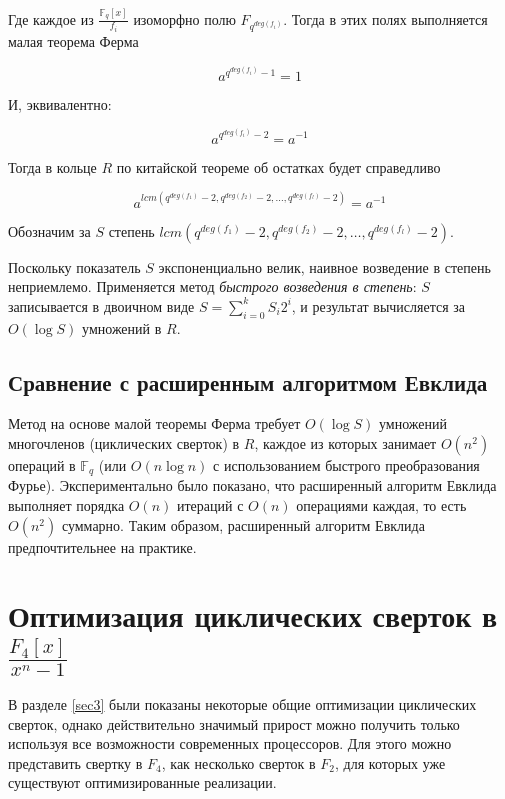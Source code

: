 \documentclass[14pt]{mmcs_article}
\theoremstyle{break}
\begin{document}
Где каждое из $\frac{\mathbb{F}_q[x]}{f_i}$ изоморфно полю $F_{q^{deg(f_i)}}$. Тогда в этих полях выполняется малая теорема Ферма

\begin{equation}
    a^{q^{deg(f_i)} - 1} = 1
\end{equation}

И, эквивалентно:

\begin{equation}
    a^{q^{deg(f_i)} - 2} = a^{-1}
\end{equation}

Тогда в кольце $R$ по китайской теореме об остатках будет справедливо

\begin{equation}
    a^{lcm(q^{deg(f_1)} - 2, q^{deg(f_2)} - 2, \ldots, q^{deg(f_l)} - 2)} = a^{-1}
\end{equation}

Обозначим за $S$ степень $lcm(q^{deg(f_1)} - 2, q^{deg(f_2)} - 2, \ldots, q^{deg(f_l)} - 2)$.

Поскольку показатель $S$ экспоненциально велик, наивное возведение в степень неприемлемо. Применяется метод \emph{быстрого возведения в степень}: $S$ записывается в двоичном виде $S = \sum_{i=0}^{k} S_i 2^i$, и результат вычисляется за $O(\log S)$ умножений в $R$.

\subsection{Сравнение с расширенным алгоритмом Евклида}

Метод на основе малой теоремы Ферма требует $O(\log S)$ умножений многочленов (циклических сверток) в $R$, каждое из которых занимает $O(n^2)$ операций в $\mathbb{F}_q$ (или $O(n \log n)$ с использованием быстрого преобразования Фурье). Экспериментально было показано, что расширенный алгоритм Евклида выполняет порядка $O(n)$ итераций с $O(n)$ операциями каждая, то есть $O(n^2)$ суммарно. Таким образом, расширенный алгоритм Евклида предпочтительнее на практике.

\section{Оптимизация циклических сверток в $\frac{F_4[x]}{x^n - 1}$}
\label{sec5}

В разделе \ref{sec3} были показаны некоторые общие оптимизации циклических сверток, однако действительно значимый прирост можно получить только используя все возможности современных процессоров. Для этого можно представить свертку в $F_4$, как несколько сверток в $F_2$, для которых уже существуют оптимизированные реализации.
\end{document}
